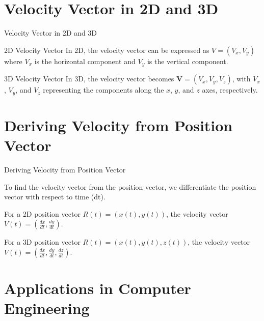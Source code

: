 \documentclass{beamer}
\begin{document}
\section{Velocity Vector in 2D and 3D}

\begin{frame}[t]{Velocity Vector in 2D and 3D}
    \vspace{15pt} %

    \begin{block}{2D Velocity Vector}
        In 2D, the velocity vector can be expressed as $ V = (V_{x}, V_{y})$ where $V_{x}$ is the horizontal
        component and $V_{y}$ is the vertical component.
    \end{block}
    \vspace{5pt} %

    \begin{block}{3D Velocity Vector}
        In 3D, the velocity vector becomes $\mathbf{V} = (V_x, V_y, V_z)$, with $V_x$, $V_y$, and $V_z$ representing the components along the $x$, $y$, and $z$ axes, respectively.
    \end{block}
  
\end{frame}


\section{Deriving Velocity from Position Vector}

\begin{frame}{Deriving Velocity from Position Vector}

To find the velocity vector from the position vector, we differentiate the position vector with respect to time (dt).

\vspace{8pt}
For a 2D position vector $R(t) = (x(t), y(t))$, the velocity vector $V(t) = \left(\frac{dx}{dt}, \frac{dy}{dt}\right)$.

\vspace{8pt}
For a 3D position vector $R(t) = (x(t), y(t), z(t))$, the velocity vector $V(t) = \left(\frac{dx}{dt}, \frac{dy}{dt}, \frac{dz}{dt}\right)$.
\end{frame}

\section{Applications in Computer Engineering}
\end{document}
